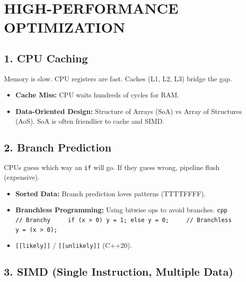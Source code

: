 \hypertarget{high-performance-optimization}{%
\chapter{HIGH-PERFORMANCE
OPTIMIZATION}\label{high-performance-optimization}}

\hypertarget{cpu-caching}{%
\section{1. CPU Caching}\label{cpu-caching}}

Memory is slow. CPU registers are fast. Caches (L1, L2, L3) bridge the
gap.

\begin{itemize}
\tightlist
\item
  \textbf{Cache Miss:} CPU waits hundreds of cycles for RAM.
\item
  \textbf{Data-Oriented Design:} Structure of Arrays (SoA) vs Array of
  Structures (AoS). SoA is often friendlier to cache and SIMD.
\end{itemize}

\hypertarget{branch-prediction}{%
\section{2. Branch Prediction}\label{branch-prediction}}

CPUs guess which way an \passthrough{\lstinline!if!} will go. If they
guess wrong, pipeline flush (expensive).

\begin{itemize}
\tightlist
\item
  \textbf{Sorted Data:} Branch prediction loves patterns (TTTTFFFF).
\item
  \textbf{Branchless Programming:} Using bitwise ops to avoid branches.
  \passthrough{\lstinline!cpp     // Branchy     if (x > 0) y = 1; else y = 0;     // Branchless     y = (x > 0);!}
\item
  \passthrough{\lstinline![[likely]]!} /
  \passthrough{\lstinline![[unlikely]]!} (C++20).
\end{itemize}

\hypertarget{simd-single-instruction-multiple-data}{%
\section{3. SIMD (Single Instruction, Multiple
Data)}\label{simd-single-instruction-multiple-data}}

